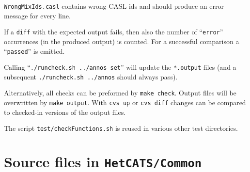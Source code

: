 \documentclass{article}
\begin{document}
\texttt{WrongMixIds.casl} contains wrong CASL ids and should produce
an error message for every line. 

If a \texttt{diff}
with the expected output fails, then also the number of
``\texttt{error}'' occurrences (in the produced output) is counted. For a
successful comparison a ``\texttt{passed}'' is emitted.

Calling ``\texttt{./runcheck.sh ../annos set}'' will update the
\texttt{*.output} files (and a subsequent \texttt{./runcheck.sh ../annos}
should always pass).

Alternatively, all checks can be preformed by \texttt{make check}. Output
files will be overwritten by \texttt{make output}. With \texttt{cvs up} or
\texttt{cvs diff} changes can be compared to checked-in versions of the output
files.

The script \texttt{test/checkFunctions.sh} is reused in various other
test directories.  

\section{Source files in \texttt{HetCATS/Common}}
\end{document}
